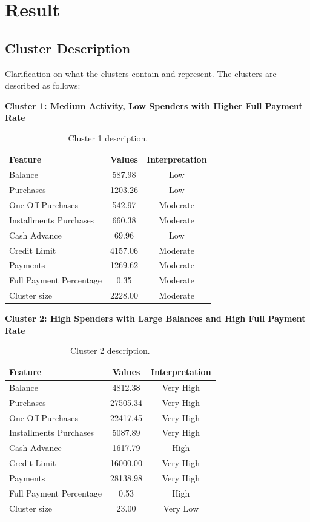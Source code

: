 \section{Result}
\subsection{Cluster Description}
Clarification on what the clusters contain and represent. The clusters are described as follows:
\vspace{0.3cm}
\par
\begin{center}
\textbf{Cluster 1: Medium Activity, Low Spenders with Higher Full Payment Rate}
\begin{table}[H]
\centering
\begin{tabular}{|l|c|c|}
\hline
\textbf{Feature} & \textbf{Values} & \textbf{Interpretation} \\ \hline
Balance & 587.98 & Low \\ \hline
Purchases & 1203.26 & Low \\ \hline
One-Off Purchases & 542.97 & Moderate \\ \hline
Installments Purchases & 660.38 & Moderate \\ \hline
Cash Advance & 69.96 & Low \\ \hline
Credit Limit & 4157.06 & Moderate \\ \hline
Payments & 1269.62 & Moderate \\ \hline
Full Payment Percentage & 0.35 & Moderate \\ \hline
Cluster size & 2228.00 & Moderate \\ \hline
\end{tabular}
\caption{Cluster 1 description.}
\end{table}

\centering
\textbf{Cluster 2: High Spenders with Large Balances and High Full Payment Rate}
\begin{table}[H]
\centering
\begin{tabular}{|l|c|c|}
\hline
\textbf{Feature} & \textbf{Values} & \textbf{Interpretation} \\ \hline
Balance & 4812.38 & Very High \\ \hline
Purchases & 27505.34 & Very High \\ \hline
One-Off Purchases & 22417.45 & Very High \\ \hline
Installments Purchases & 5087.89 & Very High \\ \hline
Cash Advance & 1617.79 & High \\ \hline
Credit Limit & 16000.00 & Very High \\ \hline
Payments & 28138.98 & Very High \\ \hline
Full Payment Percentage & 0.53 & High \\ \hline
Cluster size & 23.00 & Very Low \\ \hline
\end{tabular}
\caption{Cluster 2 description.}
\end{table}


\end{center}
